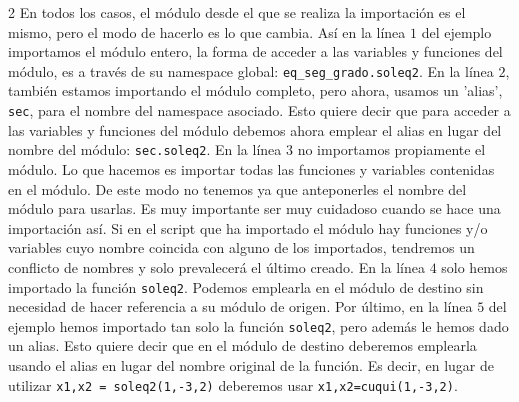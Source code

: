 \begin{paracol}{2}
En todos los casos, el módulo desde el que se realiza la importación es el mismo, pero el modo de hacerlo es lo que cambia. Así en la línea $1$ del ejemplo importamos el módulo entero, la forma de acceder a las variables y funciones del módulo, es a través de su namespace global: \texttt{eq_seg_grado.soleq2}. En la línea $2$, también estamos importando el módulo completo, pero ahora, usamos un 'alias', \texttt{sec},  para el nombre del namespace asociado. Esto quiere decir que para acceder a las variables y funciones del módulo debemos ahora emplear el alias en lugar del nombre del módulo: \texttt{sec.soleq2}. En la línea $3$ no importamos propiamente el módulo. Lo que hacemos es importar todas las funciones y variables contenidas en el módulo. De este modo no tenemos ya que anteponerles el nombre del módulo para usarlas. Es muy importante ser muy cuidadoso cuando se hace una importación así. Si en el script que ha importado el módulo hay funciones y/o variables cuyo nombre coincida con alguno de los importados, tendremos un conflicto de nombres y solo prevalecerá el último creado. En la línea $4$ solo hemos importado la función \texttt{soleq2}. Podemos emplearla en el módulo de destino sin necesidad de hacer referencia a su módulo de origen. Por último, en la línea $5$ del ejemplo hemos importado tan solo la función \texttt{soleq2}, pero además le hemos dado un alias. Esto quiere decir que en el módulo de destino deberemos emplearla usando el alias en lugar del nombre original de la función. Es decir, en lugar de utilizar \texttt{x1,x2 = soleq2(1,-3,2)} deberemos usar \texttt{x1,x2=cuqui(1,-3,2)}.
\switchcolumn

\end{paracol}
